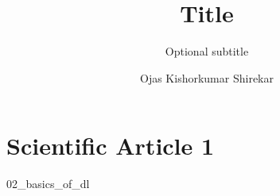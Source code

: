 \documentclass[whitelogo]{TUD-report2020}
\begin{document}
\frontmatter


\title[tudelft-white]{Title}
\subtitle[tudelft-white]{Optional subtitle}
\author[tudelft-white]{Ojas Kishorkumar Shirekar}
\makecover[split]






\tableofcontents

\mainmatter

\chapter{Scientific Article 1}








% 
{02_basics_of_dl}






\appendix

%

\printbibliography
\end{document}
